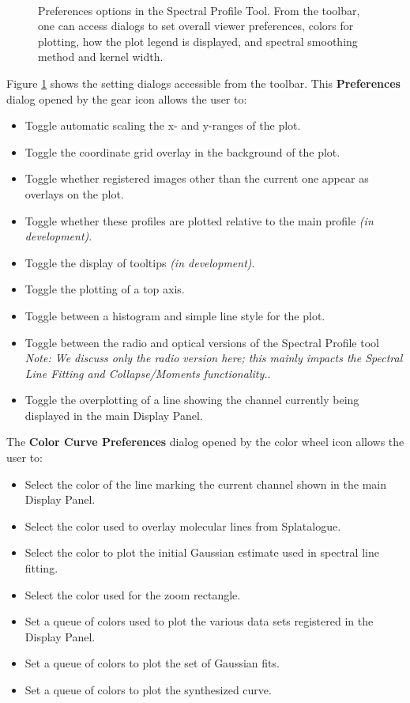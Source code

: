\begin{figure}[h!]
\begin{center}
\hrulefill \\
\caption{\label{fig:viewer_prefs} Preferences options in the Spectral Profile Tool. From the toolbar, one
can access dialogs to set overall viewer preferences, colors for
plotting, how the plot legend is displayed, and spectral smoothing
method and kernel width.}
\hrulefill
\end{center}
\end{figure}

Figure \ref{fig:viewer_prefs} shows the setting dialogs accessible from the toolbar. This {\bf Preferences} dialog opened by the gear icon allows the user to:

\begin{itemize}
\item Toggle automatic scaling the x- and y-ranges of the plot. 
\item Toggle the coordinate grid overlay in the background of the plot.
\item Toggle whether registered images other than the current one appear as overlays on the plot.
\item Toggle whether these profiles are plotted relative to the main profile {\em (in development)}.
\item Toggle the display of tooltips {\em (in development)}.
\item Toggle the plotting of a top axis.
\item Toggle between a histogram and simple line style for the plot.
\item Toggle between the radio and optical versions of the Spectral Profile tool {\em Note: We discuss only the radio version here; this mainly
impacts the Spectral Line Fitting and Collapse/Moments functionality.}.
\item Toggle the overplotting of a line showing the channel currently being displayed in the main Display Panel.
\end{itemize}

The {\bf Color Curve Preferences} dialog opened by the color wheel icon allows the user to:

\begin{itemize}
\item Select the color of the line marking the current channel shown in the main Display Panel.
\item Select the color used to overlay molecular lines from Splatalogue.
\item Select the color to plot the initial Gaussian estimate used in spectral line fitting.
\item Select the color used for the zoom rectangle.
\item Set a queue of colors used to plot the various data sets registered in the Display Panel.
\item Set a queue of colors to plot the set of Gaussian fits.
\item Set a queue of colors to plot the synthesized curve.
\end{itemize}

